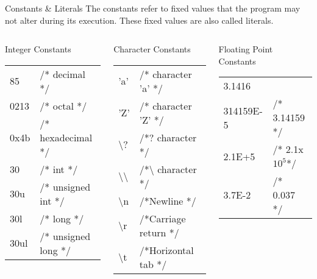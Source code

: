 \documentclass[10pt,t]{beamer}
\begin{document}
\begin{frame}{Constants \& Literals}
  The constants refer to fixed values that the program may not alter during its execution. These fixed values are also called literals.
  {\footnotesize
    \begin{columns}
      \begin{block}{Integer Constants}
        \begin{tabular}{ll}
          85         & /* decimal */\\
          0213       & /* octal */\\
          0x4b       & /* hexadecimal */\\
          30         & /* int */\\
          30u        & /* unsigned int */\\
          30l        & /* long */\\
          30ul       & /* unsigned long */\\
        \end{tabular}
      \end{block}
      \begin{block}{Character Constants}
        \begin{tabular}{ll}
          'a'                               & /* character 'a' */\\
          'Z'                               & /* character 'Z' */\\
          \textbackslash?                   & /*? character */\\
          \textbackslash{}\textbackslash{}  & /*\textbackslash{} character */\\
          \textbackslash{}n                 & /*Newline */\\
          \textbackslash{}r                 & /*Carriage return */\\
          \textbackslash{}t                 & /*Horizontal tab */\\
        \end{tabular}
      \end{block}
      \begin{block}{Floating Point Constants}
        \begin{tabular}{ll}
          3.1416    & \\
          314159E-5 & /* 3.14159 */\\
          2.1E+5    & /* 2.1x$10^5$*/\\
          3.7E-2    & /* 0.037 */\\

\end{tabular}
\end{block}
\end{columns}}
\end{frame}
\end{document}
